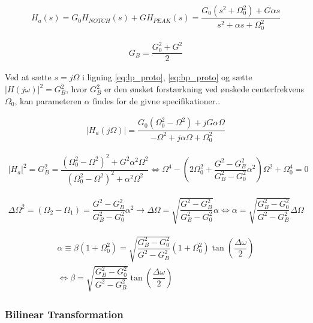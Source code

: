      \begin{align}
     H_a (s) = G_0 H_{NOTCH} (s) + G H_{PEAK} (s) = \dfrac{G_0 (s^2 + \Omega_0^2) + G \alpha s}{s^2 + \alpha s + \Omega_0^2}
     \label{eq:hp_proto}
    \end{align}

    \begin{align}
        G_B = \dfrac{G_0^2 + G^2}{2} \label{eq:gain_b}
    \end{align}

    Ved at sætte $s = j \Omega$ i ligning \ref{eq:lp_proto}, \ref{eq:hp_proto}
    og sætte $\big| H(j\omega)\big|^2 = G_B^2$, hvor $G_B^2$ er den ønsket forstærkning
    ved ønskede centerfrekvens $\Omega_0$, kan parameteren $\alpha$ findes for de givne specifikationer.. 
    
    \begin{align}
     |H_{a}(j \Omega)| = \dfrac{G_0 (\Omega_0^2- \Omega^2)+ j G \alpha \Omega}{-\Omega^2 + j \alpha \Omega + \Omega_0^2}   
    \end{align}

    \begin{align}
        |H_{a}|^2 = G_B^2 =  \dfrac{(\Omega_0^2- \Omega^2)^2 + G^2 \alpha^2 \Omega^2}{(\Omega_0^2-\Omega^2)^2 +\alpha^2 \Omega^2}   \iff \Omega^4 - \left(2 \Omega_0^2 + \dfrac{G^2- G_B^2}{G_B^2- G_0^2} \alpha^2 \right) \Omega^2 + \Omega_0^4 =0
    \end{align}
    
    
    \begin{align}
       \Delta \Omega^2 = (\Omega_2 - \Omega_1 ) = \dfrac{G^2 - G_B^2}{G_B^2 - G_0^2}  \alpha^2 \rightarrow \Delta \Omega = \sqrt{\dfrac{G^2 - G_B^2}{G_B^2 - G_0^2}} \alpha \iff \alpha = \sqrt{\dfrac{G_B^2-G_0^2}{G^2 - G_B^2 }} \Delta \Omega
    \end{align}


    \begin{align}
    \alpha \equiv \beta (1 + \Omega_0^2)  = \sqrt{\dfrac{G_B^2-G_0^2}{G^2 - G_B^2 }} \left( 1 + \Omega_0^2 \right) \tan \left( \dfrac{\Delta \omega}{2} \right) \\
    \iff \beta = \sqrt{\dfrac{G_B^2-G_0^2}{G^2 - G_B^2 }} \tan \left( \dfrac{\Delta \omega}{2} \right) \label{eq:beta}
    \end{align}


        \subsubsection{Bilinear Transformation}


